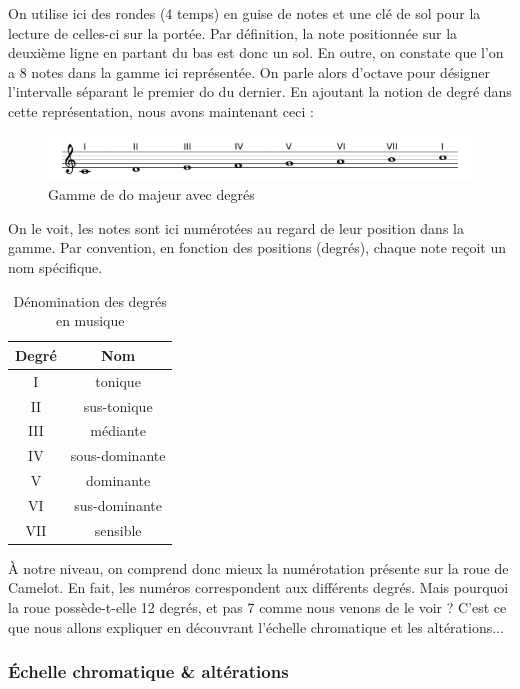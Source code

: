 \documentclass[a4paper,12pt]{article}
\begin{document}
On utilise ici des rondes (4 temps) en guise de notes et une clé de sol pour la lecture de celles-ci sur la portée. Par définition, la note positionnée sur la deuxième ligne en partant du bas est donc un sol.
En outre, on constate que l'on a 8 notes dans la gamme ici représentée. On parle alors d'octave pour désigner l'intervalle séparant le premier do du dernier. En ajoutant la notion de degré dans cette représentation, nous avons maintenant ceci :

\begin{figure}[h]
  \begin{center}
    \includegraphics[scale=0.4]{gamme-do-degres.png}
    \caption{Gamme de do majeur avec degrés}
  \end{center}
\end{figure}

On le voit, les notes sont ici numérotées au regard de leur position dans la gamme. Par convention, en fonction des positions (degrés), chaque note reçoit un nom spécifique.

\begin{table}[h]
  \centering
  \begin{tabular}{|c|c|}
    \hline
    \textbf{Degré} & \textbf{Nom} \\
    \hline
    I & tonique \\
    II & sus-tonique \\
    III & médiante \\
    IV & sous-dominante \\
    V & dominante \\
    VI & sus-dominante \\
    VII & sensible \\
    \hline
  \end{tabular}
  \caption{Dénomination des degrés en musique}
\end{table}

À notre niveau, on comprend donc mieux la numérotation présente sur la roue de Camelot. En fait, les numéros correspondent aux différents degrés. Mais pourquoi la roue possède-t-elle 12 degrés, et pas 7 comme nous venons de le voir ? C'est ce que nous allons expliquer en découvrant l'échelle chromatique et les altérations...

\subsubsection{Échelle chromatique \& altérations}
\end{document}
